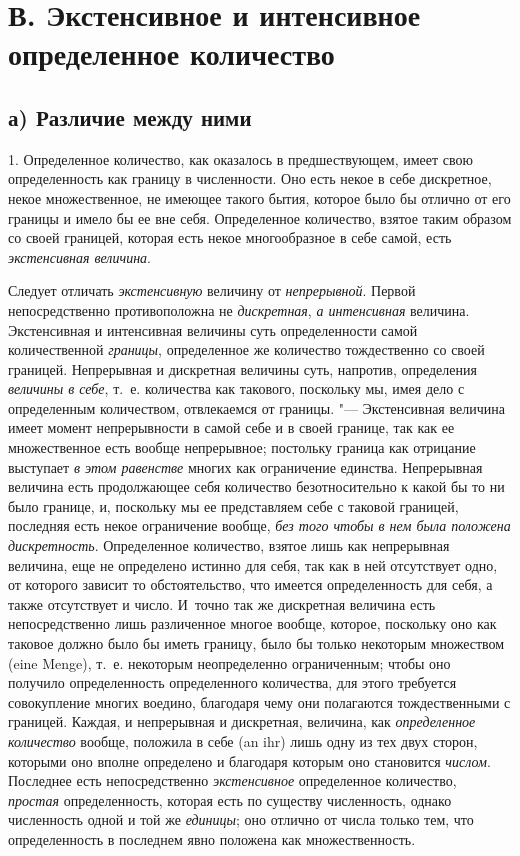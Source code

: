 \section[В. Экстенсивное и интенсивное определенное количество]{В. Экстенсивное и интенсивное определенное количество}
\subsection[а) Различие между ними]{а) Различие между ними}

1. Определенное количество, как оказалось в предшествующем, имеет свою
определенность как границу в численности. Оно есть некое в себе дискретное,
некое множественное, не имеющее такого бытия, которое было бы отлично от
его границы и имело бы ее вне себя. Определенное количество, взятое таким
образом со своей границей, которая есть некое многообразное в себе самой,
есть {\em экстенсивная величина}.

Следует отличать {\em экстенсивную} величину от
{\em непрерывной}. Первой непосредственно
противоположна не {\em дискретная},
{\em а интенсивная} величина. Экстенсивная и
интенсивная величины суть определенности самой количественной
{\em границы}, определенное же количество тождественно
со своей границей. Непрерывная и дискретная величины суть, напротив,
определения {\em величины в себе}, т.~е. количества как
такового, поскольку мы, имея дело с определенным количеством, отвлекаемся
от границы. "--- Экстенсивная величина имеет момент непрерывности в самой себе
и в своей границе, так как ее множественное есть вообще непрерывное;
постольку граница как отрицание выступает {\em в этом
равенстве} многих как ограничение единства. Непрерывная величина есть
продолжающее себя количество безотносительно к какой бы то ни было границе,
и, поскольку мы ее представляем себе с таковой границей, последняя есть
некое ограничение вообще, {\em без того чтобы в нем
была положена дискретность}. Определенное количество, взятое лишь как
непрерывная величина, еще не определено истинно для себя, так как в ней
отсутствует одно, от которого зависит то обстоятельство, что имеется
определенность для себя, а также отсутствует и число. И~точно так же
дискретная величина есть непосредственно лишь различенное многое вообще,
которое, поскольку оно как таковое должно было бы иметь границу, было бы
только некоторым множеством (eine Menge), т.~е. некоторым неопределенно
ограниченным; чтобы оно получило определенность определенного количества,
для этого требуется совокупление многих воедино, благодаря чему они
полагаются тождественными с границей. Каждая, и непрерывная и дискретная,
величина, как {\em определенное количество} вообще,
положила в себе (an ihr) лишь одну из тех двух сторон, которыми оно вполне
определено и благодаря которым оно становится
{\em числом}. Последнее есть непосредственно
{\em экстенсивное} определенное количество,
{\em простая} определенность, которая есть по существу
численность, однако численность одной и той же
{\em единицы}; оно отлично от числа только тем, что
определенность в последнем явно положена как множественность.

